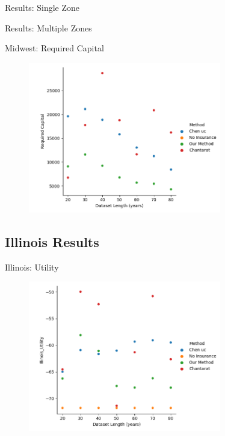 \documentclass{beamer}
\begin{document}
\begin{frame}{Results: Single Zone}
    
\end{frame}

\begin{frame}{Results: Multiple Zones}
\end{frame}

\begin{frame}{Midwest: Required Capital}
    \begin{figure}
        \includegraphics[width=0.75\textwidth]{../../../output/figures/Midwest Evaluation/Midwest_Required Capital_Length.png}
    \end{figure}
\end{frame}

\subsection*{Illinois Results}
\begin{frame}{Illinois: Utility}
    \begin{figure}
        \includegraphics[width=0.75\textwidth]{../../../output/figures/Midwest Evaluation/Illinois_Utility_Length.png}
    \end{figure}
\end{frame}
\end{document}
